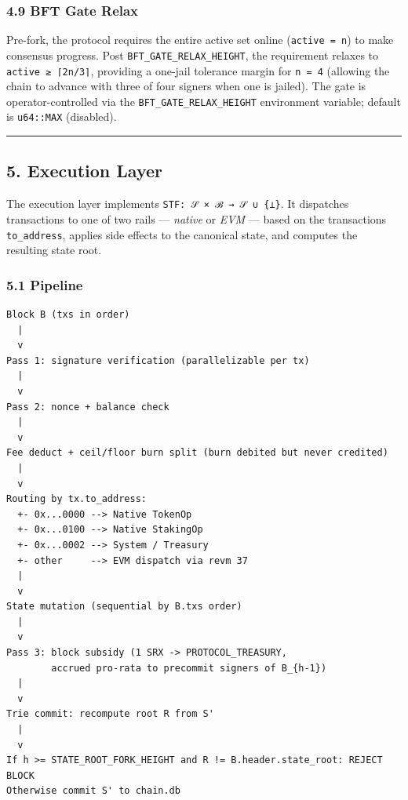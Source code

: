 \documentclass[11pt,a4paper]{article}
\newenvironment{Shaded}{}{}
\begin{document}
\hypertarget{49-bft-gate-relax}{%
\subsubsection{4.9 BFT Gate Relax}\label{49-bft-gate-relax}}

Pre-fork, the protocol requires the entire active set online
(\texttt{active\ =\ n}) to make consensus progress. Post
\texttt{BFT\_GATE\_RELAX\_HEIGHT}, the requirement relaxes to
\texttt{active\ ≥\ ⌈2n/3⌉}, providing a one-jail tolerance margin for
\texttt{n\ =\ 4} (allowing the chain to advance with three of four
signers when one is jailed). The gate is operator-controlled via the
\texttt{BFT\_GATE\_RELAX\_HEIGHT} environment variable; default is
\texttt{u64::MAX} (disabled).

\begin{center}\rule{0.5\linewidth}{0.5pt}\end{center}

\hypertarget{5-execution-layer}{%
\subsection{5. Execution Layer}\label{5-execution-layer}}

The execution layer implements \texttt{STF:\ 𝒮\ ×\ ℬ\ →\ 𝒮\ ∪\ \{⊥\}}.
It dispatches transactions to one of two rails --- \emph{native} or
\emph{EVM} --- based on the transaction\textquotesingle s
\texttt{to\_address}, applies side effects to the canonical state, and
computes the resulting state root.

\hypertarget{51-pipeline}{%
\subsubsection{5.1 Pipeline}\label{51-pipeline}}

\begin{Shaded}
\begin{verbatim}
Block B (txs in order)
  |
  v
Pass 1: signature verification (parallelizable per tx)
  |
  v
Pass 2: nonce + balance check
  |
  v
Fee deduct + ceil/floor burn split (burn debited but never credited)
  |
  v
Routing by tx.to_address:
  +- 0x...0000 --> Native TokenOp
  +- 0x...0100 --> Native StakingOp
  +- 0x...0002 --> System / Treasury
  +- other     --> EVM dispatch via revm 37
  |
  v
State mutation (sequential by B.txs order)
  |
  v
Pass 3: block subsidy (1 SRX -> PROTOCOL_TREASURY,
        accrued pro-rata to precommit signers of B_{h-1})
  |
  v
Trie commit: recompute root R from S'
  |
  v
If h >= STATE_ROOT_FORK_HEIGHT and R != B.header.state_root: REJECT BLOCK
Otherwise commit S' to chain.db
\end{verbatim}
\end{Shaded}
\end{document}
